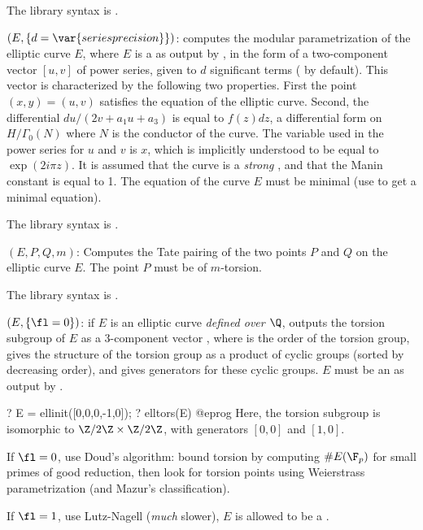 The library syntax is .

$(E, \{d = \var{seriesprecision}\})$: \label{se:elltaniyama}
computes the modular parametrization of the
elliptic curve $E$, where $E$ is a  as output by ,
in the form of a two-component vector $[u,v]$ of power series, given to $d$
significant terms ( by default). This vector is
characterized by the
following two properties. First the point $(x,y)=(u,v)$ satisfies the
equation of the elliptic curve. Second, the differential $du/(2v+a_1u+a_3)$
is equal to $f(z)dz$, a differential form on $H/\Gamma_0(N)$ where $N$ is the
conductor of the curve. The variable used in the power series for $u$ and $v$
is $x$, which is implicitly understood to be equal to $\exp(2i\pi z)$. It is
assumed that the curve is a \emph{strong} , and that the
Manin constant is equal to 1. The equation of the curve $E$ must be minimal
(use  to get a minimal equation).

The library syntax is .

$(E, P, Q, m)$: \label{se:elltatepairing}Computes the Tate pairing of the two points $P$ and $Q$ on the elliptic
curve $E$. The point $P$ must be of $m$-torsion.

The library syntax is .

$(E,\{\fl=0\})$: \label{se:elltors}
if $E$ is an elliptic curve \emph{defined
over $\Q$}, outputs the torsion subgroup of $E$ as a 3-component vector
\kbd{[t,v1,v2]}, where  is the order of the torsion group, 
gives the structure of the torsion group as a product of cyclic groups
(sorted by decreasing order), and  gives generators for these cyclic
groups. $E$ must be an  as output by .

\bprog
?  E = ellinit([0,0,0,-1,0]);
?  elltors(E)
@eprog
Here, the torsion subgroup is isomorphic to $\Z/2\Z \times \Z/2\Z$, with
generators $[0,0]$ and $[1,0]$.

If $\fl = 0$, use Doud's algorithm: bound torsion by computing $\#E(\F_p)$
for small primes of good reduction, then look for torsion points using
Weierstrass parametrization (and Mazur's classification).

If $\fl = 1$, use Lutz-Nagell (\emph{much} slower), $E$ is allowed to be a
.

